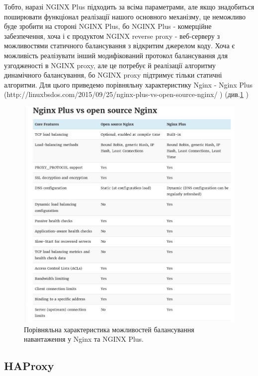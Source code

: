 \documentclass[14pt]{vakthesis}
\begin{document}
Тобто, наразі NGINX Plus підходить за всіма параметрами, але якщо знадобиться поширювати функціонал реалізації нашого основного механізму, це неможливо буде зробити на стороні NGINX Plus, бо NGINX Plus - комерційне забезпечення, хоча і є продуктом NGINX reverse proxy - веб-серверу з можливостями статичного балансування з відкритим джерелом коду. Хоча є можливість реалізувати інший модифікований протокол балансування для узгодженості в NGINX proxy, але це потребує й реалізації алгоритму динамічного балансування, бо NGINX proxy підтримує тільки статичні алгоритми. Для цього приведемо порівняльну характеристику Nginx - Nginx Plus
(http://linuxbsdos.com/2015/09/25/nginx-plus-vs-open-source-nginx/ ) (див.\ref{fig:nginx_nginx_plus} )

\begin{figure}
\centering
\includegraphics[width=\linewidth]{images/compare_nginx_nginx_plus.png}
     \caption{Порівняльна характеристика можливостей балансування навантаження у Nginx та NGINX Plus.}
     \label{fig:nginx_nginx_plus}
\end{figure}

\subsection{HAProxy}
\end{document}
